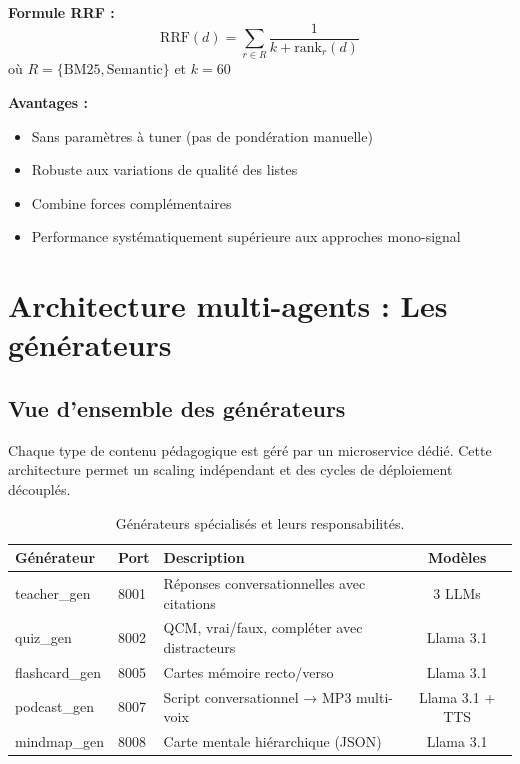 \documentclass[12pt,a4paper]{article}
\begin{document}
\textbf{Formule RRF :}
\[
\text{RRF}(d) = \sum_{r \in R} \frac{1}{k + \text{rank}_r(d)}
\]
où $R = \{\text{BM25}, \text{Semantic}\}$ et $k = 60$

\textbf{Avantages :}
\begin{itemize}
    \item Sans paramètres à tuner (pas de pondération manuelle)
    \item Robuste aux variations de qualité des listes
    \item Combine forces complémentaires
    \item Performance systématiquement supérieure aux approches mono-signal
\end{itemize}

\section{Architecture multi-agents : Les générateurs}

\subsection{Vue d'ensemble des générateurs}

Chaque type de contenu pédagogique est géré par un microservice dédié. Cette architecture permet un scaling indépendant et des cycles de déploiement découplés.

\begin{table}[H]
    \centering
    \small
    \begin{tabularx}{\textwidth}{@{}llXc@{}}
        \toprule
        \textbf{Générateur} & \textbf{Port} & \textbf{Description} & \textbf{Modèles} \\
        \midrule
        teacher\_gen & 8001 & Réponses conversationnelles avec citations & 3 LLMs \\
        quiz\_gen & 8002 & QCM, vrai/faux, compléter avec distracteurs & Llama 3.1 \\
        flashcard\_gen & 8005 & Cartes mémoire recto/verso & Llama 3.1 \\
        podcast\_gen & 8007 & Script conversationnel → MP3 multi-voix & Llama 3.1 + TTS \\
        mindmap\_gen & 8008 & Carte mentale hiérarchique (JSON) & Llama 3.1 \\
        \bottomrule
    \end{tabularx}
    \caption{Générateurs spécialisés et leurs responsabilités.}
\end{table}
\end{document}
